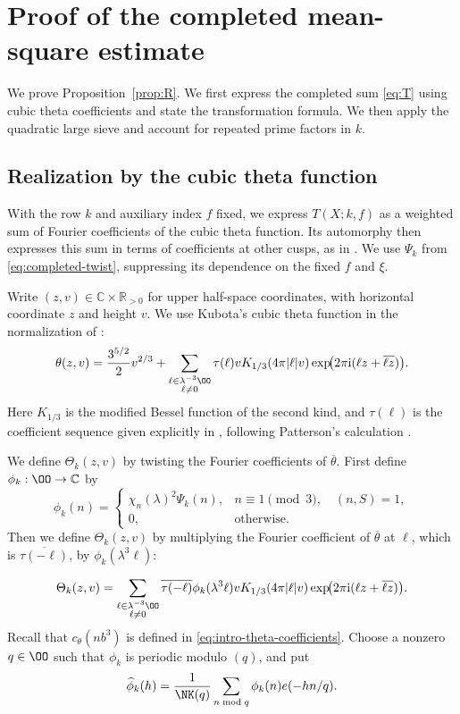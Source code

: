 \section{Proof of the completed mean-square estimate}\label{sec:reflection}

We prove Proposition~\ref{prop:R}. We first express the completed sum
\eqref{eq:T} using cubic theta coefficients and state the transformation
formula. We then apply the quadratic large sieve and account for
repeated prime factors in $k$.

\subsection{Realization by the cubic theta function}
With the row $k$ and auxiliary index $f$ fixed, we express
$T(X;k,f)$ as a weighted sum of Fourier coefficients of the cubic theta function.
Its automorphy then expresses this sum in terms of coefficients at
other cusps, as in \cite[\S5 and Appendix~A]{DR}.
We use $\Psi_k$ from \eqref{eq:completed-twist}, suppressing its dependence on the fixed $f$ and $\xi$.

Write $(z,v)\in\mathbb C\times\mathbb R_{>0}$ for upper half-space
coordinates, with horizontal coordinate $z$ and height $v$.
We use Kubota's cubic theta function in the normalization of
\cite[\S5.1, (5.6)]{DR}:
\begin{equation}\label{eq:cubic-theta-definition}
 \theta(z,v)=\frac{3^{5/2}}2v^{2/3}
 +\sum_{\substack{\ell\in\lambda^{-3}\OO\\\ell\ne0}}
 \tau(\ell)vK_{1/3}(4\pi|\ell|v)
 \exp\!\bigl(2\pi\mathrm i(\ell z+\overline{\ell z})\bigr).
\end{equation}
Here $K_{1/3}$ is the modified Bessel function of the second kind,
and $\tau(\ell)$ is the coefficient sequence given explicitly in
\cite[(5.7)--(5.8)]{DR}, following Patterson's calculation
\cite[Theorem~8.1]{Pat77}.

We define $\Theta_k(z,v)$ by twisting the Fourier coefficients of $\overline\theta$. First define $\phi_k:\OO\to\mathbb C$ by
\[
 \phi_k(n)=
 \begin{cases}
  \chi_n(\lambda)^2\Psi_k(n),&n\equiv1\pmod3,\quad(n,S)=1,\\
  0,&\text{otherwise}.
 \end{cases}
\]
Then we define $\Theta_k(z,v)$ by multiplying the Fourier coefficient of
$\overline\theta$ at $\ell$, which is $\overline{\tau(-\ell)}$, by $\phi_k(\lambda^3\ell)$:

\begin{equation}\label{eq:twisted-theta-definition}
 \Theta_k(z,v)=
 \sum_{\substack{\ell\in\lambda^{-3}\OO\\\ell\ne0}}
 \overline{\tau(-\ell)}\phi_k(\lambda^3\ell)
 vK_{1/3}(4\pi|\ell|v)
 \exp\!\bigl(2\pi\mathrm i(\ell z+\overline{\ell z})\bigr).
\end{equation}
Recall that $c_\theta(nb^3)$ is defined in
\eqref{eq:intro-theta-coefficients}. 
Choose a nonzero $q\in\OO$ such that $\phi_k$ is periodic modulo $(q)$, and put
\[
 \widehat\phi_k(h)=\frac1{\NK(q)}\sum_{n\bmod q}\phi_k(n)e(-hn/q).
\]

